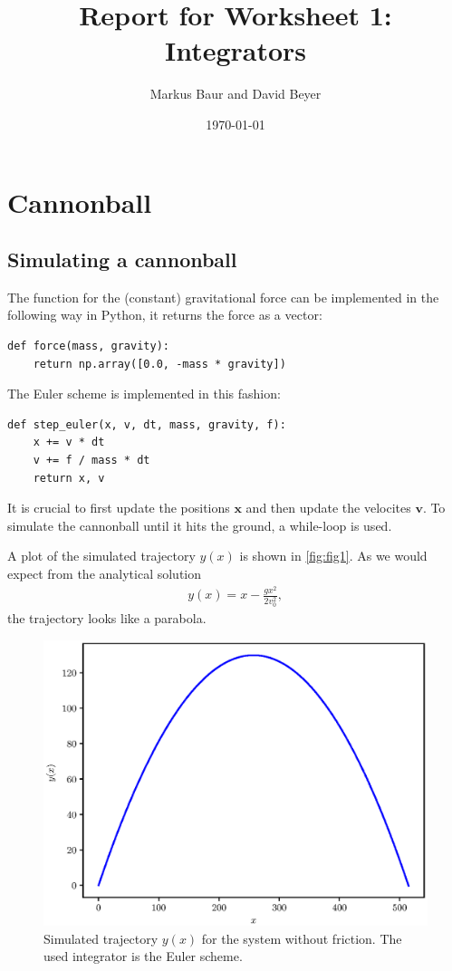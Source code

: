 \documentclass[a4paper,10pt,bibtotoc]{scrartcl}
\begin{document}
\titlehead{Simulation Methods in Physics I \hfill WS 2019/2010}
\title{Report for Worksheet 1: Integrators}
\author{Markus Baur and David Beyer}
\date{\today}
\maketitle

\tableofcontents

\section{Cannonball}
\subsection{Simulating a cannonball}
The function for the (constant) gravitational force can be implemented in the following way in Python, it returns the force as a vector:
\begin{lstlisting}
def force(mass, gravity):
    return np.array([0.0, -mass * gravity])
\end{lstlisting}
The Euler scheme is implemented in this fashion:
\begin{lstlisting}
def step_euler(x, v, dt, mass, gravity, f):
    x += v * dt
    v += f / mass * dt
    return x, v
\end{lstlisting}
It is crucial to first update the positions $\mathbf{x}$ and then update the velocites $\mathbf{v}$. To simulate the cannonball until it hits the ground, a while-loop is used.

A plot of the simulated trajectory $y(x)$ is shown in \autoref{fig:fig1}. As we would expect from the analytical solution
\begin{align}
 y(x) = x - \frac{gx^2}{2v_0^2},
\end{align}
the trajectory looks like a parabola.

\begin{figure}[h]
\centering
 \includegraphics[width=\textwidth]{Figure_1.eps}
 \caption{Simulated trajectory $y(x)$ for the system without friction. The used integrator is the Euler scheme.}
 \label{fig:fig1}
\end{figure}
\end{document}
